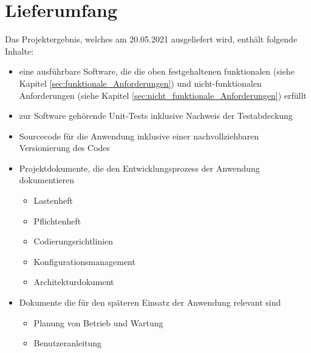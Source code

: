 \chapter{Lieferumfang}
Das Projektergebnis, welches am 20.05.2021 ausgeliefert wird, enthält folgende Inhalte:
\begin{itemize}
\item eine ausführbare Software, die die oben festgehaltenen funktionalen (siehe Kapitel \ref{sec:funktionale_Anforderungen}) und nicht-funktionalen Anforderungen (siehe Kapitel \ref{sec:nicht_funktionale_Anforderungen}) erfüllt
\item zur Software gehörende Unit-Tests inklusive Nachweis der Testabdeckung
\item Sourcecode für die Anwendung inklusive einer nachvollziehbaren Versionierung des Codes
\item Projektdokumente, die den Entwicklungsprozess der Anwendung dokumentieren
	\begin{itemize}
		\item Lastenheft
		\item Pflichtenheft
		\item Codierungsrichtlinien
		\item Konfigurationsmanagement
		\item Architekturdokument
	\end{itemize} 
\item Dokumente die für den späteren Einsatz der Anwendung relevant sind
	\begin{itemize}
		\item Planung von Betrieb und Wartung
		\item Benutzeranleitung
	\end{itemize}
\end{itemize}